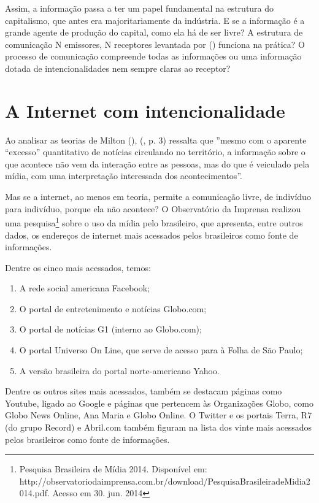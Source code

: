 \documentclass[
	article,			%
	12pt,				%
	oneside,			%
	a4paper,			%
	english,			%
	brazil,				%
	]{abntex2}
\begin{document}
Assim, a informação passa a ter um papel fundamental na estrutura do capitalismo, que antes era majoritariamente da indústria. E se a informação é a grande agente de produção do capital, como ela há de ser livre? A estrutura de comunicação N emissores, N receptores levantada por  (\citeyear{levy1998}) funciona na prática? O processo de comunicação compreende todas as informações ou uma informação dotada de intencionalidades nem sempre claras ao receptor?

\section*{A Internet com intencionalidade}

Ao analisar as teorias de Milton  (\citeyear{santos2001}),  (\citeyear{pasti2013}, p. 3) ressalta que ''mesmo com o aparente “excesso” quantitativo de notícias circulando no território, a informação sobre o que acontece não vem da interação entre as pessoas, mas do que é veiculado pela mídia, com uma interpretação interessada dos acontecimentos''.

Mas se a internet, ao menos em teoria, permite a comunicação livre, de indivíduo para indivíduo, porque ela não acontece? O Observatório da Imprensa realizou uma pesquisa\footnote{Pesquisa Brasileira de Mídia 2014. Disponível em: http://observatoriodaimprensa.com.br/download/PesquisaBrasileiradeMidia2014.pdf. Acesso em 30. jun. 2014} sobre o uso da mídia pelo brasileiro, que apresenta, entre outros dados, os endereços de internet mais acessados pelos brasileiros como fonte de informações.

Dentre os cinco mais acessados, temos: 

\begin{enumerate}
\item A rede social americana Facebook;
\item O portal de entretenimento e notícias Globo.com;
\item O portal de notícias G1 (interno ao Globo.com);
\item O portal Universo On Line, que serve de acesso para à Folha de São Paulo;
\item A versão brasileira do portal norte-americano Yahoo.
\end{enumerate}

Dentre os outros sites mais acessados, também se destacam páginas como Youtube, ligado ao Google e páginas que pertencem às Organizações Globo, como Globo News Online, Ana Maria e Globo Online. O Twitter e os portais Terra, R7 (do grupo Record) e Abril.com também figuram na lista dos vinte mais acessados pelos brasileiros como fonte de informações.
\end{document}
